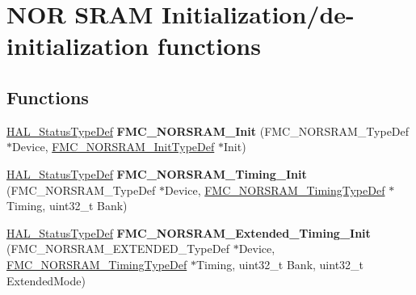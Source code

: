 \hypertarget{group___f_m_c___l_l___n_o_r_s_r_a_m___private___functions___group1}{}\section{N\+OR S\+R\+AM Initialization/de-\/initialization functions}
\label{group___f_m_c___l_l___n_o_r_s_r_a_m___private___functions___group1}
\subsection*{Functions}
\begin{DoxyCompactItemize}
\item 
\hyperlink{stm32f4xx__hal__def_8h_a63c0679d1cb8b8c684fbb0632743478f}{H\+A\+L\+\_\+\+Status\+Type\+Def} {\bfseries F\+M\+C\+\_\+\+N\+O\+R\+S\+R\+A\+M\+\_\+\+Init} (F\+M\+C\+\_\+\+N\+O\+R\+S\+R\+A\+M\+\_\+\+Type\+Def $\ast$Device, \hyperlink{struct_f_m_c___n_o_r_s_r_a_m___init_type_def}{F\+M\+C\+\_\+\+N\+O\+R\+S\+R\+A\+M\+\_\+\+Init\+Type\+Def} $\ast$Init)\hypertarget{group___f_m_c___l_l___n_o_r_s_r_a_m___private___functions___group1_ga69f71e9189dab5f8b384065a9165b8bd}{}\label{group___f_m_c___l_l___n_o_r_s_r_a_m___private___functions___group1_ga69f71e9189dab5f8b384065a9165b8bd}

\item 
\hyperlink{stm32f4xx__hal__def_8h_a63c0679d1cb8b8c684fbb0632743478f}{H\+A\+L\+\_\+\+Status\+Type\+Def} {\bfseries F\+M\+C\+\_\+\+N\+O\+R\+S\+R\+A\+M\+\_\+\+Timing\+\_\+\+Init} (F\+M\+C\+\_\+\+N\+O\+R\+S\+R\+A\+M\+\_\+\+Type\+Def $\ast$Device, \hyperlink{struct_f_m_c___n_o_r_s_r_a_m___timing_type_def}{F\+M\+C\+\_\+\+N\+O\+R\+S\+R\+A\+M\+\_\+\+Timing\+Type\+Def} $\ast$Timing, uint32\+\_\+t Bank)\hypertarget{group___f_m_c___l_l___n_o_r_s_r_a_m___private___functions___group1_ga95dcf37fab03f8995bbacca99f7092ff}{}\label{group___f_m_c___l_l___n_o_r_s_r_a_m___private___functions___group1_ga95dcf37fab03f8995bbacca99f7092ff}

\item 
\hyperlink{stm32f4xx__hal__def_8h_a63c0679d1cb8b8c684fbb0632743478f}{H\+A\+L\+\_\+\+Status\+Type\+Def} {\bfseries F\+M\+C\+\_\+\+N\+O\+R\+S\+R\+A\+M\+\_\+\+Extended\+\_\+\+Timing\+\_\+\+Init} (F\+M\+C\+\_\+\+N\+O\+R\+S\+R\+A\+M\+\_\+\+E\+X\+T\+E\+N\+D\+E\+D\+\_\+\+Type\+Def $\ast$Device, \hyperlink{struct_f_m_c___n_o_r_s_r_a_m___timing_type_def}{F\+M\+C\+\_\+\+N\+O\+R\+S\+R\+A\+M\+\_\+\+Timing\+Type\+Def} $\ast$Timing, uint32\+\_\+t Bank, uint32\+\_\+t Extended\+Mode)\hypertarget{group___f_m_c___l_l___n_o_r_s_r_a_m___private___functions___group1_gaf59154ca6a3208092f248fe25cd421c5}{}\label{group___f_m_c___l_l___n_o_r_s_r_a_m___private___functions___group1_gaf59154ca6a3208092f248fe25cd421c5}


\end{DoxyCompactItemize}
